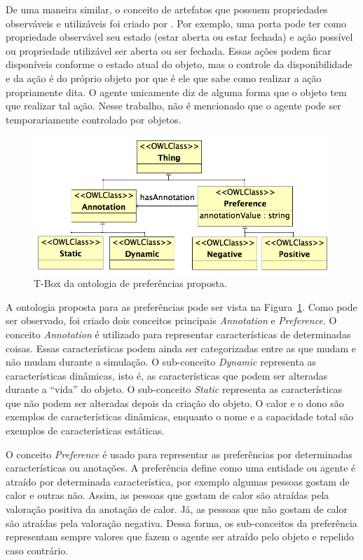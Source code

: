 De uma maneira similar, o conceito de artefatos que possuem propriedades
observáveis e utilizáveis foi criado por \citet{ricci31cartago}. Por exemplo,
uma porta pode ter como propriedade observável seu estado (estar aberta ou
estar fechada) e ação possível ou propriedade utilizável ser aberta ou ser
fechada. Essas ações podem ficar disponíveis conforme o estado atual do
objeto, mas o controle da disponibilidade e da ação é do próprio objeto por
que é ele que sabe como realizar a ação propriamente dita. O agente unicamente
diz de alguma forma que o objeto tem que realizar tal ação. Nesse trabalho,
não é mencionado que o agente pode ser temporariamente controlado por
objetos.

\begin{figure}
  \centering
    \includegraphics[width=130mm]{figuras/preferences.png}
  \caption{T-Box da ontologia de preferências proposta.}
  \label{fig:preferences}
\end{figure}

A ontologia proposta para as preferências pode ser vista na
Figura~\ref{fig:preferences}. Como pode ser observado, foi criado dois
conceitos principais \emph{Annotation} e \emph{Preference}. O conceito
\emph{Annotation} é utilizado para representar características de determinadas
coisas. Essas características podem ainda ser categorizadas entre as que mudam
e não mudam durante a simulação. O sub-conceito \emph{Dynamic} representa as
características dinâmicas, isto é, as características que podem ser alteradas
durante a ``vida'' do objeto. O sub-conceito \emph{Static} representa as
características que não podem ser alteradas depois da criação do objeto. O
calor e o dono são exemplos de características dinâmicas, enquanto o nome e a
capacidade total são exemplos de características estáticas.

O conceito \emph{Preference} é usado para representar as preferências por
determinadas características ou anotações. A preferência define como uma entidade ou
agente é atraído por determinada característica, por exemplo algumas pessoas
gostam de calor e outras não. Assim, as pessoas que gostam de calor são
atraídas pela valoração positiva da anotação de calor. Já, as pessoas que não
gostam de calor são atraídas pela valoração negativa. Dessa forma, os
sub-conceitos da preferência representam sempre valores que fazem o agente ser
atraído pelo objeto e repelido caso contrário.

